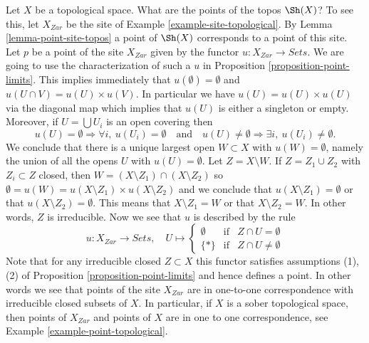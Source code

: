 \begin{example}
\label{example-point-topology}
Let $X$ be a topological space. What are the points of the topos
$\Sh(X)$? To see this, let $X_{Zar}$ be the site of
Example \ref{example-site-topological}.
By
Lemma \ref{lemma-point-site-topos}
a point of $\Sh(X)$ corresponds to a point of this site.
Let $p$ be a point of the site $X_{Zar}$ given by the functor
$u : X_{Zar} \to \textit{Sets}$. We are going to use the
characterization of such a $u$ in
Proposition \ref{proposition-point-limits}.
This implies immediately that $u(\emptyset) = \emptyset$ and
$u(U \cap V) = u(U) \times u(V)$. In particular we have
$u(U) = u(U) \times u(U)$ via the diagonal map which implies that $u(U)$
is either a singleton or empty. Moreover, if $U = \bigcup U_i$ is an
open covering then
$$
u(U) = \emptyset \Rightarrow \forall i, \ u(U_i) = \emptyset
\quad\text{and}\quad
u(U) \not = \emptyset \Rightarrow \exists i, \ u(U_i) \not= \emptyset.
$$
We conclude that there is a unique largest open $W \subset X$ with
$u(W) = \emptyset$, namely the union of all the opens $U$ with
$u(U) = \emptyset$. Let $Z = X \setminus W$. If $Z = Z_1 \cup Z_2$ with
$Z_i \subset Z$ closed, then $W = (X \setminus Z_1) \cap (X \setminus Z_2)$
so $\emptyset = u(W) = u(X \setminus Z_1) \times u(X \setminus Z_2)$
and we conclude that $u(X \setminus Z_1) = \emptyset$ or that
$u(X \setminus Z_2) = \emptyset$. This means that $X \setminus Z_1 = W$
or that $X \setminus Z_2 = W$. In other words, $Z$ is irreducible.
Now we see that $u$ is described by the rule
$$
u : X_{Zar} \longrightarrow \textit{Sets}, \quad
U \mapsto
\left\{
\begin{matrix}
\emptyset & \text{if} & Z \cap U = \emptyset \\
\{*\} & \text{if} & Z \cap U \not = \emptyset
\end{matrix}
\right.
$$
Note that for any irreducible closed $Z \subset X$ this
functor satisfies assumptions (1), (2) of
Proposition \ref{proposition-point-limits}
and hence defines a point. In other words we see that points of
the site $X_{Zar}$ are in one-to-one correspondence with
irreducible closed subsets of $X$. In particular, if $X$ is
a sober topological space, then points of $X_{Zar}$ and
points of $X$ are in one to one correspondence, see
Example \ref{example-point-topological}.
\end{example}

